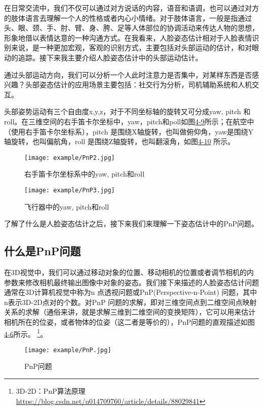在日常交流中，我们不仅可以通过对方说话的内容，语音和语调，也可以通过对方的肢体语言去理解一个人的性格或者内心小情绪。对于肢体语言，一般是指通过头、眼、颈、手、肘、臂、身、胯、足等人体部位的协调活动来传达人物的思想，形象地借以表情达意的一种沟通方式。在我看来，人脸姿态估计相对于人脸表情识别来说，是一种更加宏观，客观的识别方式，主要包括对头部运动的估计，和对眼动的追踪。接下来我主要介绍人脸姿态估计中的头部运动估计。

通过头部运动方向，我们可以分析一个人此时注意力是否集中，对某样东西是否感兴趣？头部姿态估计的应用场景主要包括：社交行为分析，司机辅助系统和人机交互。

头部姿势运动有三个自由度x,y,z，对于不同坐标轴的旋转又可分成yaw, pitch 和roll。在三维空间的右手笛卡尔坐标中，yaw，pitch和poll如图\href{fig:4-9}{4-9}所示；在航空中（使用右手笛卡尔坐标系），pitch 是围绕X轴旋转，也叫做俯仰角，yaw是围绕Y轴旋转，也叫偏航角，roll 是围绕Z轴旋转，也叫翻滚角，如图\href{fig:4-10}{4-10} 所示。

\begin{figure}[!htp]
\centering
\texttt{[image: example/PnP2.jpg]}
\caption{右手笛卡尔坐标系中的yaw, pitch和roll}
\label{fig1:4-8}
\end{figure}

\begin{figure}[!htp]
\centering
\texttt{[image: example/PnP3.jpg]}
\caption{飞行器中的yaw, pitch和roll}
\label{fig1:4-8}
\end{figure}

了解了什么是人脸姿态估计之后，接下来我们来理解一下姿态估计中的PnP问题。

\subsection{什么是PnP问题}

在3D视觉中，我们可以通过移动对象的位置、移动相机的位置或者调节相机的内参数来修改相机最终输出图像中对象的姿态。我们接下来描述的人脸姿态估计问题通常在3D计算机视觉中称为n 点透视问题或PnP(Perspective-n-Point) 问题，其中n表示3D-2D点对的个数。对PnP 问题的求解，即对三维空间点到二维空间点映射关系的求解（通俗来讲，就是求解三维到二维空间的变换矩阵），它可以用来估计相机所在的位姿，或者物体的位姿（这二者是等价的），PnP问题的直观描述如图\href{fig:4-6}{4-6}所示。
\footnote{3D-2D：PnP算法原理 \quad \url{https://blog.csdn.net/u014709760/article/details/88029841}}。

\begin{figure}[!htp]

\centering
\texttt{[image: example/PnP.jpg]}
\caption{PnP问题}
\label{figure:4-6}
\end{figure}

